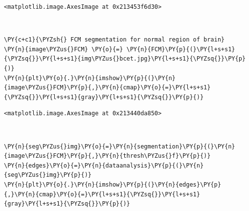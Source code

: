 \begin{tcolorbox}[breakable, size=fbox, boxrule=.5pt, pad at break*=1mm, opacityfill=0]
	\begin{Verbatim}[commandchars=\\\{\}]
<matplotlib.image.AxesImage at 0x213453f6d30>
	\end{Verbatim}
\end{tcolorbox}

\begin{center}
\end{center}
{ \hspace*{\fill} \\}

\begin{tcolorbox}[breakable, size=fbox, boxrule=1pt, pad at break*=1mm,colback=cellbackground, colframe=cellborder]
	\begin{Verbatim}[commandchars=\\\{\}]
\PY{c+c1}{\PYZsh{} FCM segmentation for normal region of brain}
\PY{n}{image\PYZus{}FCM} \PY{o}{=} \PY{n}{FCM}\PY{p}{(}\PY{l+s+s1}{\PYZsq{}}\PY{l+s+s1}{img\PYZus{}bcet.jpg}\PY{l+s+s1}{\PYZsq{}}\PY{p}{)}
\PY{n}{plt}\PY{o}{.}\PY{n}{imshow}\PY{p}{(}\PY{n}{image\PYZus{}FCM}\PY{p}{,}\PY{n}{cmap}\PY{o}{=}\PY{l+s+s1}{\PYZsq{}}\PY{l+s+s1}{gray}\PY{l+s+s1}{\PYZsq{}}\PY{p}{)}
	\end{Verbatim}
\end{tcolorbox}

\begin{tcolorbox}[breakable, size=fbox, boxrule=.5pt, pad at break*=1mm, opacityfill=0]
	\begin{Verbatim}[commandchars=\\\{\}]
<matplotlib.image.AxesImage at 0x213440da850>
	\end{Verbatim}
\end{tcolorbox}

\begin{center}
\end{center}
{ \hspace*{\fill} \\}

\begin{tcolorbox}[breakable, size=fbox, boxrule=1pt, pad at break*=1mm,colback=cellbackground, colframe=cellborder]
	\begin{Verbatim}[commandchars=\\\{\}]
\PY{n}{seg\PYZus{}img}\PY{o}{=}\PY{n}{segmentation}\PY{p}{(}\PY{n}{image\PYZus{}FCM}\PY{p}{,}\PY{n}{thresh\PYZus{}f}\PY{p}{)}
\PY{n}{edges}\PY{o}{=}\PY{n}{dataanalysis}\PY{p}{(}\PY{n}{seg\PYZus{}img}\PY{p}{)}
\PY{n}{plt}\PY{o}{.}\PY{n}{imshow}\PY{p}{(}\PY{n}{edges}\PY{p}{,}\PY{n}{cmap}\PY{o}{=}\PY{l+s+s1}{\PYZsq{}}\PY{l+s+s1}{gray}\PY{l+s+s1}{\PYZsq{}}\PY{p}{)}
	\end{Verbatim}
\end{tcolorbox}


